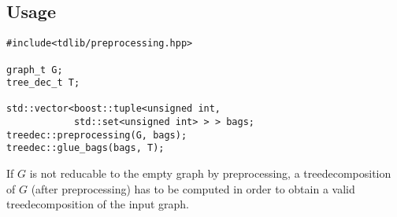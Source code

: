 \documentclass[a4wide]{article}
\begin{document}
\subsection{Usage}

\begin{lstlisting}[mathescape]
#include<tdlib/preprocessing.hpp>

graph_t G;
tree_dec_t T;

std::vector<boost::tuple<unsigned int,
            std::set<unsigned int> > > bags;
treedec::preprocessing(G, bags);
treedec::glue_bags(bags, T);
\end{lstlisting}

If $G$ is not reducable to the empty graph by preprocessing, a treedecomposition of $G$ (after preprocessing) has to be computed in order to obtain a valid treedecomposition of the input graph.
\end{document}
